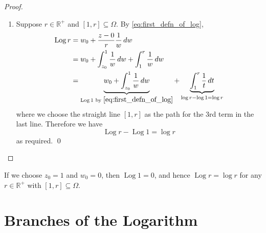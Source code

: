 \documentclass[11pt, oneside]{book}
\DeclareMathOperator{\Log}{Log}
\begin{document}
\begin{proof}
\begin{enumerate}
    \item Suppose $r \in \mathbb{R}^+$ and $[1, r] \subseteq \Omega$. By \cref{eq:first_defn_of_log},
    \begin{align*}
      \Log r &= w_0 + \frac{z-0}{r} \frac{1}{w} \dif{w} \\
        &= w_0 + \int_{z_0}^{1} \frac{1}{w} \dif{w} + \int_{1}^{r} \frac{1}{w} \dif{w} \\
        &= \underbrace{w_0 + \int_{z_0}^{1} \frac{1}{w} \dif{w} }_{\Log 1 \text{ by } \cref{eq:first_defn_of_log}} + \underbrace{\int_{1}^{r} \frac{1}{t} \dif{t} }_{\log r - \log 1 = \log r}
    \end{align*}
    where we choose the straight line $[1, r]$ as the path for the 3rd term in the last line. Therefore we have
    \begin{equation*}
      \Log r - \Log 1 = \log r
    \end{equation*}
    as required. \qed
  \end{enumerate}
\end{proof}

\begin{note}
  If we choose $z_0 = 1$ and $w_0 = 0$, then $\Log 1 = 0$, and hence $\Log r = \log r$ for any $r \in \mathbb{R}^+$ with $[1, r] \subseteq \Omega$.
\end{note}


\section{Branches of the Logarithm} %
\label{sec:branches_of_the_logarithm}
\end{document}
